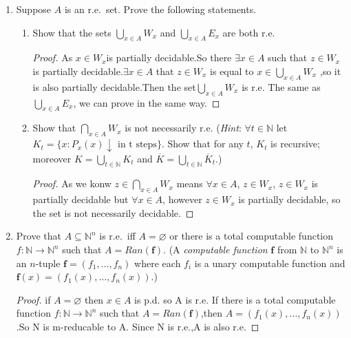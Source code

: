 \documentclass[12pt,a4paper]{article}
\theoremstyle{definition}
\numberwithin{equation}{section}
\numberwithin{figure}{section}
\begin{document}
\begin{enumerate}
\item Suppose $A$ is an r.e.~set. Prove the following statements.
\begin{enumerate}
\item Show that the sets $\bigcup\limits_{x\in A}W_x$ and $\bigcup\limits_{x\in A}E_x$ are both r.e.
\begin{proof}
    As $x \in W_x$is partially decidable.So there $\exists x \in A$ such that $z \in W_x$
    is partially decidable.$\exists x \in A$ that $z \in W_x$ is equal to $x \in  \bigcup\limits_{x\in A}W_x$
    ,so it is also partially decidable.Then the set$\bigcup\limits_{x\in A}W_x$ is r.e. The same as $\bigcup\limits_{x\in A}E_x$, we can prove in the same way.
\end{proof}
\item Show that $\bigcap\limits_{x\in A}W_x$ is not necessarily r.e. (\emph{Hint}: $\forall t \in \mathbb{N}$ let $K_t=\{x:P_x(x)\downarrow \mbox{ in t steps}\}$. Show that for any $t$, $K_t$ is recursive; moreover $K=\bigcup\limits_{t\in\mathbb{N}}K_t$ and $\overline{K}=\bigcup\limits_{t\in\mathbb{N}}\overline{K}_t$.)
\begin{proof}
    As we konw $z \in \bigcap\limits_{x\in A}W_x$ means $\forall x \in A $, $z \in W_x$, $z \in W_x$ is partially decidable but $\forall x \in A $, however $z \in W_x$ is partially decidable, so the set is not necessarily decidable.
\end{proof}
\end{enumerate}

\item Prove that $A\subseteq\mathbb{N}^n$ is r.e.~iff $A=\varnothing$ or there is a total computable function $f:\mathbb{N}\rightarrow\mathbb{N}^n$ such that $A=Ran(\bm{f})$. (A \emph{computable function} $\bm{f}$ from $\mathbb{N}$ to $\mathbb{N}^n$ is an $n$-tuple $\bm{f}=(f_1,\ldots,f_n)$ where each $f_i$ is a unary computable function and $\bm{f}(x)=(f_1(x),\ldots,f_n(x))$.)
\begin{proof}
    if $A=\varnothing$ then $x \in A$ is p.d. so A is r.e. If there is a total computable function $f:\mathbb{N}\rightarrow\mathbb{N}^n$ such that $A=Ran(\bm{f})$,then $A=(f_1(x),\ldots,f_n(x))$.So N is m-reducable to A. Since N is r.e.,A is also r.e.
\end{proof}


\end{enumerate}
\end{document}
